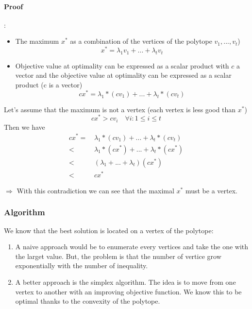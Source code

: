 \paragraph{Proof} : 
\begin{itemize}
    \item The maximum $x^{*}$ as a combination of the vertices of the
        polytope $v_{1},...,v_{t}$)
        $$x^{*} = \lambda_{1} v_{1} + ... + \lambda_{t} v_{t}$$

    \item Objective value at optimality can be expressed as a scalar
        product with $c$ a vector
        and the objective value at optimality can be expressed as a scalar product (c is a vector)
        $$c x^{*} = \lambda_{1} * (cv_{1}) + ... + \lambda_{t} * (cv_{t})$$
\end{itemize}

Let's assume that the maximum is not a vertex (each vertex is less good than $x^{*}$) \\
$$cx^{*} > cv_{i} \quad \forall i : 1 \leq i \leq t$$
Then we have 
\begin{align*}
cx^{*} =& \, \lambda_{1} * (cv_{1}) + ... + \lambda_{t} * (cv_{t}) \\
<& \, \lambda_{1} * (cx^{*}) + ... + \lambda_{t} * (cx^{*}) \\
<& \, (\lambda_{1} + ... + \lambda_{t}) (cx^{*}) \\
<& \, cx^{*}
\end{align*}

$\Rightarrow $ With this contradiction we can see that the maximal
$x^{*}$ must be a vertex.

\subsubsection{Algorithm}
We know that the best solution is located on a vertex of the
polytope:
\begin{enumerate}

    \item A naive approach would be to enumerate every vertices and take
        the one with the larget value. But, the problem is that the
        number of vertice grow exponentially with the number of
        inequality. 

    \item A better approach is the simplex algorithm. The idea is to
        move from one vertex to another with an improving objective
        function. We know this to be optimal thanks to the convexity of
        the polytope.
\end{enumerate}


